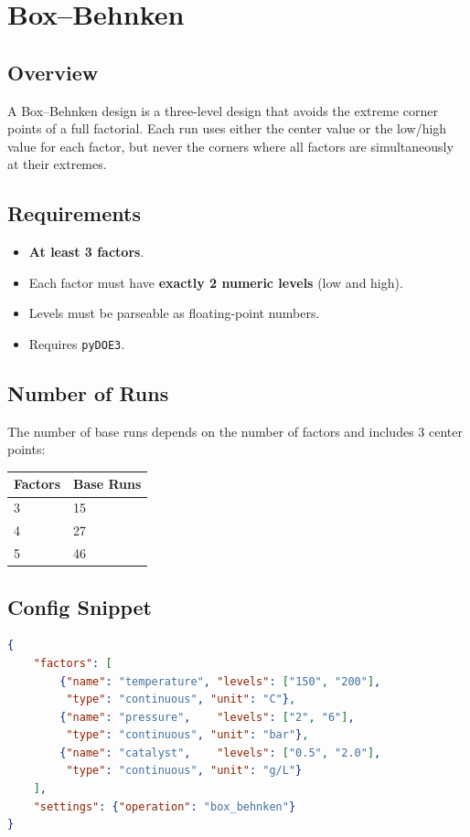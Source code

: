 \documentclass[11pt]{book}
\begin{document}
\section{Box--Behnken}

\subsection{Overview}

A Box--Behnken design is a three-level design that avoids the extreme corner points of a full factorial. Each run uses either the center value or the low/high value for each factor, but never the corners where all factors are simultaneously at their extremes.

\subsection{Requirements}
\begin{itemize}[nosep]
  \item \textbf{At least 3 factors}.
  \item Each factor must have \textbf{exactly 2 numeric levels} (low and high).
  \item Levels must be parseable as floating-point numbers.
  \item Requires \texttt{pyDOE3}.
\end{itemize}

\subsection{Number of Runs}

The number of base runs depends on the number of factors and includes 3 center points:

\begin{table}[H]
\centering
\begin{tabular}{@{}ll@{}}
\toprule
\textbf{Factors} & \textbf{Base Runs} \\
\midrule
3 & 15 \\
4 & 27 \\
5 & 46 \\
\bottomrule
\end{tabular}
\end{table}

\subsection{Config Snippet}

\begin{lstlisting}[language=json]
{
    "factors": [
        {"name": "temperature", "levels": ["150", "200"],
         "type": "continuous", "unit": "C"},
        {"name": "pressure",    "levels": ["2", "6"],
         "type": "continuous", "unit": "bar"},
        {"name": "catalyst",    "levels": ["0.5", "2.0"],
         "type": "continuous", "unit": "g/L"}
    ],
    "settings": {"operation": "box_behnken"}
}
\end{lstlisting}
\end{document}
